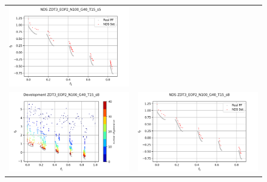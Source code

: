 \begin{figure}[H]
\begin{tabular}{c c}
    \includegraphics[scale=0.5]{figures/ZDT3_EOP2_N100_G40_T15/s5_nds.png}\\
    \includegraphics[scale=0.5]{figures/ZDT3_EOP2_N100_G40_T15/s8_dev.png} &
    \includegraphics[scale=0.5]{figures/ZDT3_EOP2_N100_G40_T15/s8_nds.png}\\

\end{tabular}
\end{figure}
